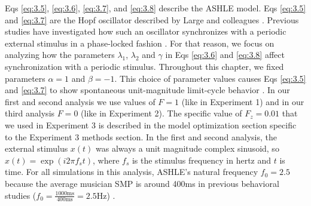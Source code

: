 \documentclass[10pt,letterpaper]{article}
\begin{document}
Eqs \eqref{eq:3.5}, \eqref{eq:3.6}, \eqref{eq:3.7}, and \eqref{eq:3.8} describe the ASHLE model. Eqs \eqref{eq:3.5} and \eqref{eq:3.7} are the Hopf oscillator described by Large and colleagues \cite{large2010canonical}. Previous studies have investigated how such an oscillator synchronizes with a periodic external stimulus in a phase-locked fashion \cite{kim2015signal}. For that reason, we focus on analyzing how the parameters $\lambda_1$, $\lambda_2$ and $\gamma$ in Eqs \eqref{eq:3.6} and \eqref{eq:3.8} affect synchronization with a periodic stimulus. Throughout this chapter, we fixed parameters $\alpha=1$ and $\beta=-1$. This choice of parameter values causes Eqs \eqref{eq:3.5} and \eqref{eq:3.7} to show spontaneous unit-magnitude limit-cycle behavior \cite{kim2015signal}. In our first and second analysis we use values of $F = 1$ (like in Experiment 1) and in our third analysis $F = 0$ (like in Experiment 2). The specific value of $F_z = 0.01$ that we used in Experiment 3 is described in the model optimization section specific to the Experiment 3 methods section. In the first and second analysis, the external stimulus $x(t)$ was always a unit magnitude complex sinusoid, so $x(t) = \exp(i2\pi f_s t)$, where $f_s$ is the stimulus frequency in hertz and $t$ is time. For all simulations in this analysis, ASHLE's natural frequency $f_0 = 2.5$ because the average musician SMP is around 400ms in previous behavioral studies ($f_0 = \frac{1000\text{ms}}{400\text{ms}}=2.5\text{Hz}$) \cite{scheurich2018tapping, zamm2018musicians, zamm2016endogenous}.
\end{document}
